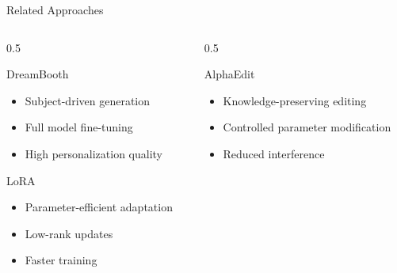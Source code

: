 \documentclass[aspectratio=169]{beamer}
\begin{document}

\begin{frame}{Related Approaches}


\begin{columns}

\begin{column}{0.5\textwidth}

\begin{block}{DreamBooth}
\begin{itemize}
    \item Subject-driven generation
    \item Full model fine-tuning
    \item High personalization quality
\end{itemize}
\end{block}


\begin{block}{LoRA}
\begin{itemize}
    \item Parameter-efficient adaptation
    \item Low-rank updates
    \item Faster training
\end{itemize}
\end{block}

\end{column}


\begin{column}{0.5\textwidth}

\begin{block}{AlphaEdit}
\begin{itemize}
    \item Knowledge-preserving editing
    \item Controlled parameter modification
    \item Reduced interference
\end{itemize}
\end{block}

\end{column}

\end{columns}


\end{frame}


\end{document}
